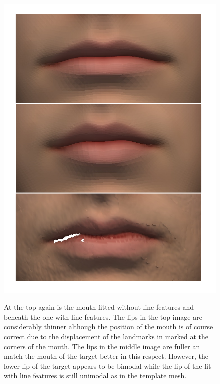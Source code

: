 \begin{figure}[h!]
    \centering
    \includegraphics[width=.8\textwidth]{./resources/img/00029_mouth_comparison.pdf}
    \label{fig:00029_mouth_comparison}
    \caption{At the top again is the mouth fitted without line features and beneath the one with line features. The lips in the top image are considerably thinner although the position of the mouth is of course correct due to the displacement of the landmarks in marked at the corners of the mouth. The lips in the middle image are fuller an match the mouth of the target better in this respect. However, the lower lip of the target appears to be bimodal while the lip of the fit with
    line features is still unimodal as in the template mesh.}
\end{figure}
\pagebreak

